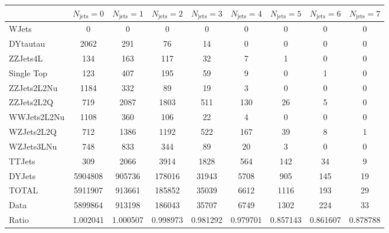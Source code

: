 \footnotesize{
\begin{tabular}{l|cccccccc} 
  &  $N_{\text{jets}} = 0 $ & $N_{\text{jets}} = 1 $ & $N_{\text{jets}} = 2 $ & $N_{\text{jets}} = 3 $ & $N_{\text{jets}} = 4 $ & $N_{\text{jets}} = 5 $ & $N_{\text{jets}} = 6 $ & $N_{\text{jets}} = 7$ \\ \hline 
   WJets        & 0 & 0 & 0 & 0 & 0 & 0 & 0 & 0 \\ 
   DYtautau        & 2062 & 291 & 76 & 14 & 0 & 0 & 0 & 0 \\ 
   ZZJets4L        & 134 & 163 & 117 & 32 & 7 & 1 & 0 & 0 \\ 
   Single Top        & 123 & 407 & 195 & 59 & 9 & 0 & 1 & 0 \\ 
   ZZJets2L2Nu        & 1184 & 332 & 89 & 19 & 3 & 0 & 0 & 0 \\ 
   ZZJets2L2Q        & 719 & 2087 & 1803 & 511 & 130 & 26 & 5 & 0 \\ 
   WWJets2L2Nu        & 1108 & 360 & 106 & 22 & 4 & 0 & 0 & 0 \\ 
   WZJets2L2Q        & 712 & 1386 & 1192 & 522 & 167 & 39 & 8 & 1 \\ 
   WZJets3LNu        & 748 & 833 & 344 & 89 & 20 & 3 & 0 & 0 \\ 
   TTJets        & 309 & 2066 & 3914 & 1828 & 564 & 142 & 34 & 9 \\ 
   DYJets        & 5904808 & 905736 & 178016 & 31943 & 5708 & 905 & 145 & 19 \\ 
 \hline 
 TOTAL & 5911907 & 913661 & 185852 & 35039 & 6612 & 1116 & 193 & 29 \\ 
 \hline 
 Data          & 5899864 & 913198 & 186043 & 35707 & 6749 & 1302 & 224 & 33 \\ 
  Ratio          & 1.002041 & 1.000507 & 0.998973 & 0.981292 & 0.979701 & 0.857143 & 0.861607 & 0.878788 \\ 
 \end{tabular}}